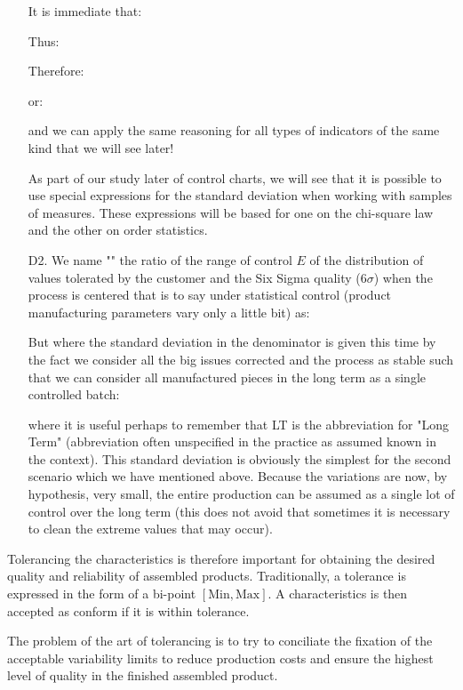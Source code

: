 \begin{enumerate}
		It is immediate that:
		
		Thus:
		
		Therefore:	
		
		or:	
		
		and we can apply the same reasoning for all types of indicators of the same kind that we will see later!
		\begin{tcolorbox}[title=Remark,colframe=black,arc=10pt]
As part of our study later of control charts, we will see that it is possible to use special expressions for the standard deviation when working with samples of measures. These expressions will be based for one on the chi-square law and the other on order statistics.
		\end{tcolorbox}
				\item[D2.] We name "" the ratio of the range of control $E$ of the distribution of values tolerated by the customer and the Six Sigma quality ($6 \sigma$) when the process is centered that is to say under statistical control (product manufacturing parameters vary only a little bit) as:
			
			But where the standard deviation in the denominator is given this time by the fact we consider all the big issues corrected and the process as stable such that we can consider all manufactured pieces in the long term as a single controlled batch:
			
			where it is useful perhaps to remember that LT is the abbreviation for "Long Term" (abbreviation often unspecified in the practice as assumed known in the context). This standard deviation is obviously the simplest for the second scenario which we have mentioned above. Because the variations are now, by hypothesis, very small, the entire production can be assumed as a single lot of control over the long term (this does not avoid that sometimes it is necessary to clean the extreme values that may occur).
	\end{enumerate}
Tolerancing the characteristics is therefore important for obtaining the desired quality and reliability of assembled products. Traditionally, a tolerance is expressed in the form of a bi-point $[\text{Min}, \text{Max}]$. A characteristics is then accepted as conform if it is within tolerance.

The problem of the art of tolerancing is to try to conciliate the fixation of the acceptable variability limits to reduce production costs and ensure the highest level of quality in the finished assembled product.

